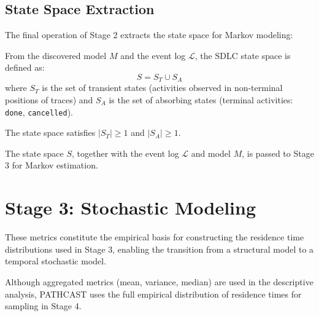 \subsection{State Space Extraction}
\label{sec:s2-states}

The final operation of Stage 2 extracts the state space for Markov modeling:

\begin{definition}
\label{def:state-space}
From the discovered model $M$ and the event log $\mathcal{L}$, the SDLC 
state space is defined as:
\begin{equation}
\label{eq:state-space}
S = S_T \cup S_A
\end{equation}
where $S_T$ is the set of transient states (activities observed in 
non-terminal positions of traces) and $S_A$ is the set of absorbing 
states (terminal activities: \texttt{done}, \texttt{cancelled}).

The state space satisfies $|S_T| \geq 1$ and $|S_A| \geq 1$.
\end{definition}

The state space $S$, together with the event log $\mathcal{L}$ and 
model $M$, is passed to Stage 3 for Markov estimation.


\section{Stage 3: Stochastic Modeling}
\label{sec:stage3}
These metrics constitute the empirical basis for constructing the residence time distributions used in Stage 3, enabling the transition from a structural model to a temporal stochastic model.

Although aggregated metrics (mean, variance, median) are used in the descriptive analysis, PATHCAST uses the full empirical distribution of residence times for sampling in Stage 4.

